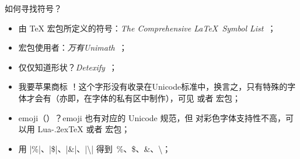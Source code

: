 \begin{frame}[fragile]{如何寻找符号？}
	\begin{itemize}
		\item<1-> 由 \TeX{} 宏包所定义的符号：\emph{The Comprehensive \LaTeX~Symbol List}~；
		\item<2->  宏包使用者：\emph{万有Unimath}~；
		\item<3-> 仅仅知道形状？\emph{Detexify}~；
		\item<4-> 我要苹果商标 \faApple！这个字形没有收录在Unicode标准中，换言之，只有特殊的字体才会有（亦即，在字体的私有区中制作），可见  或者  宏包；
		\item<5-> emoji（）？emoji 也有对应的 Unicode 规范，但 对彩色字体支持性不高，可以用 Lua\kern-.2ex\TeX{} 或者  宏包；
		\item<6-> 用 |\%|、|\$|、|\&|、|\textbackslash| 得到~\%、\$、\&、\textbackslash{}；
	\end{itemize}
\end{frame}